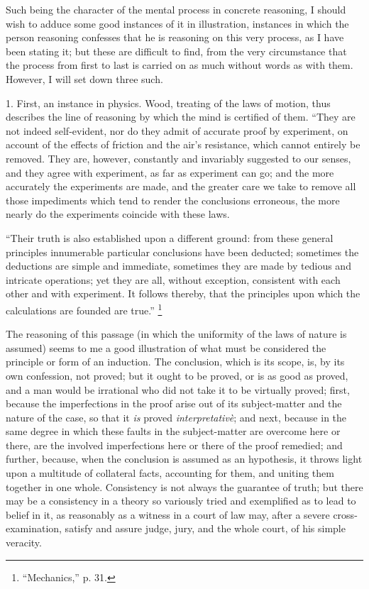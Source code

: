 Such being the character of the mental process in concrete
reasoning, I should wish to adduce some good instances of it in
illustration, instances in which the person reasoning confesses that
he is reasoning on this very process, as I have been stating it; but
these are difficult to find, from the very circumstance that the
process from first to last is carried on as much without words as with
them. However, I will set down three such.

1. First, an instance in physics. Wood, treating of the laws of
motion, thus describes the line of reasoning by which the mind is
certified of them. ``They are not indeed self-evident, nor do they
admit of accurate proof by experiment, on account of the effects of
friction and the air's resistance, which cannot entirely be removed.
They are, however, constantly and invariably suggested to our senses,
and they agree with experiment, as far as experiment can go; and the
more accurately the experiments are made, and the greater care we take
to remove all those impediments which tend to render the conclusions
erroneous, the more nearly do the experiments coincide with these
laws.

``Their truth is also established upon a different ground: from
these general principles innumerable particular conclusions have
been deducted; sometimes the deductions are simple and immediate,
sometimes they are made by tedious and intricate operations; yet they
are all, without exception, consistent with each other and with
experiment. It follows thereby, that the principles upon which the
calculations are founded are true.'' \footnote{``Mechanics,'' p. 31.}

The reasoning of this passage (in which the uniformity of the laws
of nature is assumed) seems to me a good illustration of what must be
considered the principle or form of an induction. The conclusion,
which is its scope, is, by its own confession, not proved; but it
ought to be proved, or is as good as proved, and a man would be
irrational who did not take it to be virtually proved; first, because
the imperfections in the proof arise out of its subject-matter and the
nature of the case, so that it \emph{is} proved \emph{interpretativè}; and
next, because in the same degree in which these faults in the
subject-matter are overcome here or there, are the involved
imperfections here or there of the proof remedied; and further,
because, when the conclusion is assumed as an hypothesis, it throws
light upon a multitude of collateral facts, accounting for them, and
uniting them together in one whole. Consistency is not always the
guarantee of truth; but there may be a consistency in a theory so
variously tried and exemplified as to lead to belief in it, as
reasonably as a witness in a court of law may, after a severe
cross-examination, satisfy and assure judge, jury, and the whole
court, of his simple veracity.

